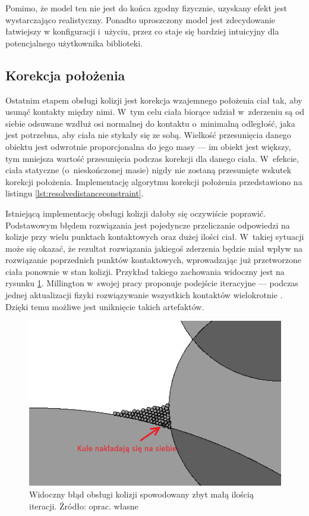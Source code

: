 Pomimo, że model ten nie jest do końca zgodny fizycznie, uzyskany efekt jest wystarczająco realistyczny. Ponadto uproszczony model jest zdecydowanie łatwiejszy w konfiguracji i~użyciu, przez co staje się bardziej intuicyjny dla potencjalnego użytkownika biblioteki.

\subsection{Korekcja położenia}
Ostatnim etapem obsługi kolizji jest korekcja wzajemnego położenia ciał tak, aby usunąć kontakty między nimi. W~tym celu ciała biorące udział w~zderzeniu są od siebie odsuwane wzdłuż osi normalnej do kontaktu o~minimalną odległość, jaka jest potrzebna, aby ciała nie stykały się ze sobą. Wielkość przesunięcia danego obiektu jest odwrotnie proporcjonalna do jego masy --- im obiekt jest większy, tym mniejsza wartość przesunięcia podczas korekcji dla danego ciała. W~efekcie, ciała statyczne (o~nieskończonej masie) nigdy nie zostaną przesunięte wskutek korekcji położenia. Implementację algorytmu korekcji położenia przedstawiono na listingu \ref{lst:resolvedistanceconstraint}.




Istniejącą implementację obsługi kolizji dałoby się oczywiście poprawić. Podstawowym błędem rozwiązania jest pojedyncze przeliczanie odpowiedzi na kolizje przy wielu punktach kontaktowych oraz dużej ilości ciał. W~takiej sytuacji może się okazać, że rezultat rozwiązania jakiegoś zderzenia będzie miał wpływ na rozwiązanie poprzednich punktów kontaktowych, wprowadzając już przetworzone ciała ponownie w stan kolizji. Przykład takiego zachowania widoczny jest na rysunku \ref{fig:anomalia-kolizja}. Millington w~swojej pracy proponuje podejście iteracyjne --- podczas jednej aktualizacji fizyki rozwiązywanie wszystkich kontaktów wielokrotnie \cite{bib:millington}. Dzięki temu możliwe jest uniknięcie takich artefaktów.
\begin{figure}[ht]
	\centering
	\includegraphics[width=0.7\linewidth]{images/anomalia-kolizja}
	\caption[Widoczny błąd obsługi kolizji spowodowany zbyt małą ilością iteracji]{Widoczny błąd obsługi kolizji spowodowany zbyt małą ilością iteracji. \newline Źródło: oprac. własne}
	\label{fig:anomalia-kolizja}
\end{figure}



